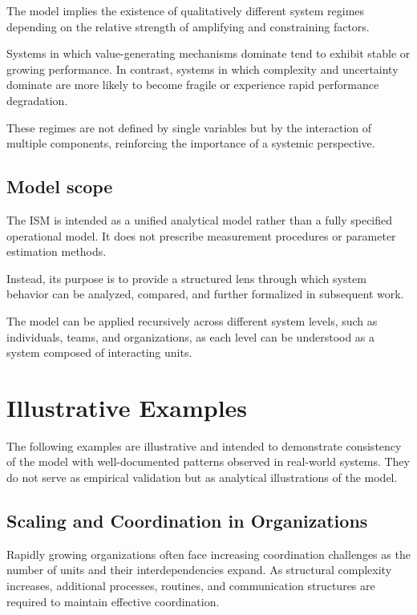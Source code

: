 \documentclass[11pt,a4paper]{article}
\theoremstyle{definition}
\begin{document}
The model implies the existence of qualitatively different system regimes depending on the relative strength of amplifying and constraining factors.

Systems in which value-generating mechanisms dominate tend to exhibit stable or growing performance.
In contrast, systems in which complexity and uncertainty dominate are more likely to become fragile or experience rapid performance degradation.

These regimes are not defined by single variables but by the interaction of multiple components, reinforcing the importance of a systemic perspective.

\subsection{Model scope}
\label{subsec:scope}

The \ac{ISM} is intended as a unified analytical model rather than a fully specified operational model.
It does not prescribe measurement procedures or parameter estimation methods.

Instead, its purpose is to provide a structured lens through which system behavior can be analyzed, compared, and further formalized in subsequent work.

The model can be applied recursively across different system levels, such as individuals, teams, and organizations, as each level can be understood as a system composed of interacting units.


\section{Illustrative Examples}
\label{sec:examples}

The following examples are illustrative and intended to demonstrate consistency of the model with well-documented patterns observed in real-world systems.
They do not serve as empirical validation but as analytical illustrations of the model.


\subsection{Scaling and Coordination in Organizations}
\label{subsec:example_scaling}

Rapidly growing organizations often face increasing coordination challenges as the number of units and their interdependencies expand.
As structural complexity increases, additional processes, routines, and communication structures are required to maintain effective coordination.
\end{document}
